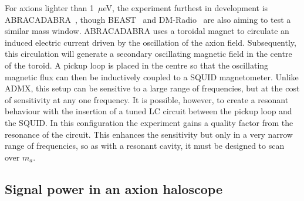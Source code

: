 \documentclass[prd,10pt,twocolumn,showpacs,nofootinbib,aps,superscriptaddress,preprintnumbers]{revtex4-1}
\begin{document}
For axions lighter than 1~$\mu$eV, the experiment furthest in development is ABRACADABRA~\cite{Kahn:2016aff,Foster:2017hbq,Henning:2018ogd},
though BEAST~\cite{McAllister:2018ndu} and DM-Radio~\cite{Silva-Feaver:2016qhh} are also aiming to test a similar mass window.
ABRACADABRA uses a toroidal magnet to circulate an induced electric current driven by the oscillation of the axion field. 
Subsequently, this circulation will generate a secondary oscillating magnetic field in the centre of the toroid. 
A pickup loop is placed in the centre so that the oscillating magnetic flux can then be inductively coupled to a SQUID magnetometer.
Unlike ADMX, this setup can be sensitive to a large range of frequencies, but at the cost of sensitivity at any one frequency. 
It is possible, however, to create a resonant behaviour with the insertion of a tuned LC circuit between the pickup loop and the SQUID. 
In this configuration the experiment gains a quality factor from the resonance of the circuit. 
This enhances the sensitivity but only in a very narrow range of frequencies, so as with a resonant cavity, it must be designed to scan over $m_a$. 

\subsection{Signal power in an axion haloscope}
\end{document}
